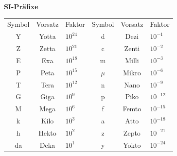 \documentclass[eglish/german]{latex4ei/latex4ei_sheet}
\begin{document}
\begin{sectionbox}
	\textbf{SI-Präfixe}\\
	\begin{tabular}{ccl|ccl}
	Symbol & Vorsatz & Faktor & Symbol & Vorsatz & Faktor \\
	Y&Yotta&$10^{24}$& d &Dezi&$10^{-1}$\\
	Z&Zetta&$10^{21}$& c &Zenti&$10^{-2}$\\
	E&Exa&$10^{18}$& m & Milli&$10^{-3}$\\
	P&Peta&$10^{15}$& $\mu$ & Mikro&$10^{-6}$\\
	T&Tera&$10^{12}$& n &Nano&$10^{-9}$\\
 	G&Giga&$10^9$& p &Piko&$10^{-12}$\\
	M&Mega&$10^6$& f &Femto&$10^{-15}$\\
	k&Kilo&$10^3$& a &Atto&$10^{-18}$\\
	h&Hekto&$10^2$& z & Zepto&$10^{-21}$\\
	da&Deka&$10^1$ & y &Yokto&$10^{-24}$\\
	\end{tabular}
\end{sectionbox}
\end{document}
